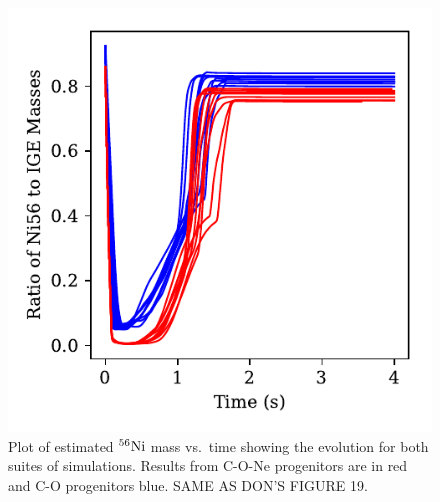 \documentclass[iop,apj]{emulateapj}
\newcommand{\Ni}[1]{\ensuremath{{}^{#1}{\rm Ni}}}
\begin{document}
\begin{figure}
\includegraphics[width=\columnwidth]{figures/RatioNi56IGE_v_time_plot.pdf}
\caption{\label{fig:compare_ratio}
Plot of estimated \Ni{56} mass vs.\ time showing the evolution
for both suites of simulations. Results from
C-O-Ne progenitors are in red and C-O progenitors blue.
{\color{red} SAME AS DON'S FIGURE 19}.
}
\end{figure}
\end{document}
